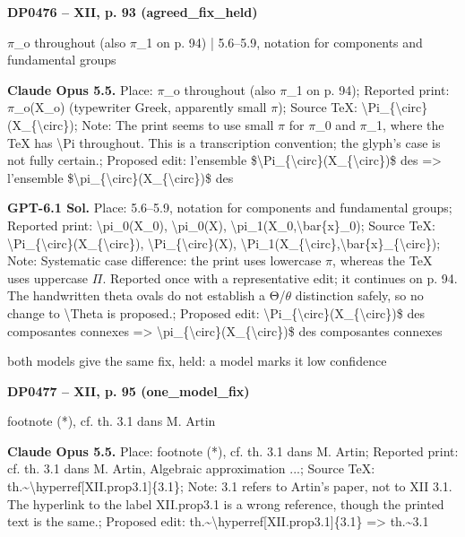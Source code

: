 \par\noindent\hypertarget{DP0476}{}\textbf{DP0476 -- XII, p. 93 (agreed\_fix\_held)}\par
\ensuremath{\pi}\_o throughout (also \ensuremath{\pi}\_1 on p. 94) | 5.6–5.9, notation for components and fundamental groups\par
\textbf{Claude Opus 5.5.} Place: \ensuremath{\pi}\_o throughout (also \ensuremath{\pi}\_1 on p. 94); Reported print: \ensuremath{\pi}\_o(X\_o) (typewriter Greek, apparently small \ensuremath{\pi}); Source TeX: \textbackslash{}Pi\_\{\textbackslash{}circ\}(X\_\{\textbackslash{}circ\}); Note: The print seems to use small \ensuremath{\pi} for \ensuremath{\pi}\_0 and \ensuremath{\pi}\_1, where the TeX has \textbackslash{}Pi throughout. This is a transcription convention; the glyph's case is not fully certain.; Proposed edit: l'ensemble \$\textbackslash{}Pi\_\{\textbackslash{}circ\}(X\_\{\textbackslash{}circ\})\$ des =\allowbreak > l'ensemble \$\textbackslash{}pi\_\{\textbackslash{}circ\}(X\_\{\textbackslash{}circ\})\$ des\par
\textbf{GPT-6.1 Sol.} Place: 5.6–5.9, notation for components and fundamental groups; Reported print: \textbackslash{}pi\_0(X\_0), \textbackslash{}pi\_0(X), \textbackslash{}pi\_1(X\_0,\textbackslash{}bar\{x\}\_0); Source TeX: \textbackslash{}Pi\_\{\textbackslash{}circ\}(X\_\{\textbackslash{}circ\}), \textbackslash{}Pi\_\{\textbackslash{}circ\}(X), \textbackslash{}Pi\_1(X\_\{\textbackslash{}circ\},\textbackslash{}bar\{x\}\_\{\textbackslash{}circ\}); Note: Systematic case difference: the print uses lowercase \ensuremath{\pi}, whereas the TeX uses uppercase \ensuremath{\Pi}. Reported once with a representative edit; it continues on p. 94. The handwritten theta ovals do not establish a Θ/\ensuremath{\theta} distinction safely, so no change to \textbackslash{}Theta is proposed.; Proposed edit: \textbackslash{}Pi\_\{\textbackslash{}circ\}(X\_\{\textbackslash{}circ\})\$ des composantes connexes =\allowbreak > \textbackslash{}pi\_\{\textbackslash{}circ\}(X\_\{\textbackslash{}circ\})\$ des composantes connexes\par
both models give the same fix, held: a model marks it low confidence\par
\par\noindent\hypertarget{DP0477}{}\textbf{DP0477 -- XII, p. 95 (one\_model\_fix)}\par
footnote (*), cf. th. 3.1 dans M. Artin\par
\textbf{Claude Opus 5.5.} Place: footnote (*), cf. th. 3.1 dans M. Artin; Reported print: cf. th. 3.1 dans M. Artin, Algebraic approximation ...; Source TeX: th.\textasciitilde{}\textbackslash{}hyperref[XII.prop3.1]\{3.1\}; Note: 3.1 refers to Artin's paper, not to XII 3.1. The hyperlink to the label XII.prop3.1 is a wrong reference, though the printed text is the same.; Proposed edit: th.\textasciitilde{}\textbackslash{}hyperref[XII.prop3.1]\{3.1\} =\allowbreak > th.\textasciitilde{}3.1\par

